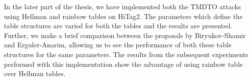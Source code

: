 In the later part of the thesis, we have implemented both the TMDTO attacks using Hellman and rainbow tables on HiTag2. The parameters which define the table structures are varied for both the tables and the results are presented. Further, we make a brief comparison between the proposals by Biryukov-Shamir and Erguler-Anarim, allowing us to see the performance of both these table structures for the same parameters. The results from the subsequent experiments performed with this implementation show the advantage of using rainbow table over Hellman tables.